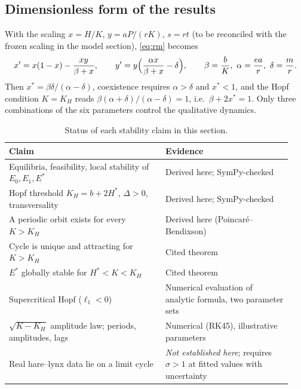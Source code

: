 \subsection{Dimensionless form of the results}

With the scaling $x=H/K$, $y=aP/(rK)$, $s=rt$ (to be reconciled with the frozen scaling in the
model section), \eqref{eq:rm} becomes
\[
x'=x(1-x)-\frac{xy}{\beta+x},\qquad y'=y\Bigl(\frac{\alpha x}{\beta+x}-\delta\Bigr),
\qquad \beta=\frac{b}{K},\ \alpha=\frac{ea}{r},\ \delta=\frac{m}{r}.
\]
Then $x^*=\beta\delta/(\alpha-\delta)$, coexistence requires $\alpha>\delta$ and $x^*<1$, and the
Hopf condition $K=K_H$ reads $\beta(\alpha+\delta)/(\alpha-\delta)=1$, i.e.\ $\beta+2x^*=1$.
Only three combinations of the six parameters control the qualitative dynamics.

\begin{table}[ht]
\centering
\small
\caption{Status of each stability claim in this section.}
\label{tab:joel-evidence}
\begin{tabular}{@{}p{0.52\linewidth}p{0.42\linewidth}@{}}
\toprule
Claim & Evidence \\
\midrule
Equilibria, feasibility, local stability of $E_0,E_1,E^*$ & Derived here; SymPy-checked\\
Hopf threshold $K_H=b+2H^*$, $\Delta>0$, transversality & Derived here; SymPy-checked\\
A periodic orbit exists for every $K>K_H$ & Derived here (Poincar\'e--Bendixson)\\
Cycle is unique and attracting for $K>K_H$ & Cited theorem~\cite{cheng1981}\\
$E^*$ globally stable for $H^*<K<K_H$ & Cited theorem~\cite{hsu1978}\\
Supercritical Hopf ($\ell_1<0$) & Numerical evaluation of analytic formula, two parameter sets\\
$\sqrt{K-K_H}$ amplitude law; periods, amplitudes, lags & Numerical (RK45), illustrative parameters\\
Real hare--lynx data lie on a limit cycle & \emph{Not established here}; requires $\sigma>1$ at fitted values with uncertainty\\
\bottomrule
\end{tabular}
\end{table}
